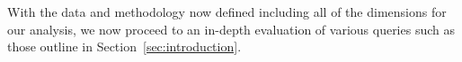 With the data and methodology now defined including all of the
dimensions for our analysis, 
we now proceed to an in-depth evaluation of various
queries such as those outline in Section~\ref{sec:introduction}.

